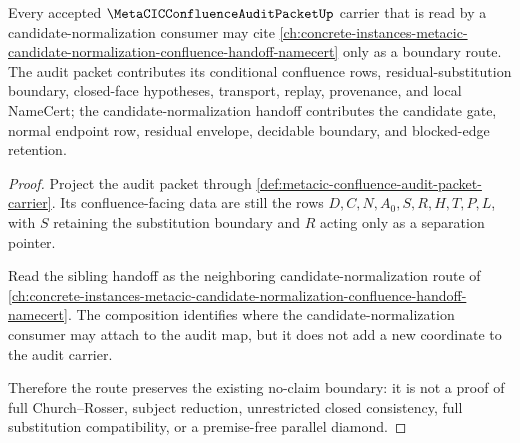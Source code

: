 \begin{lemma}
\label{lem:metacic-confluence-audit-candidate-normalization-sibling-route}
Every accepted $\MetaCICConfluenceAuditPacketUp$ carrier that is read by a candidate-normalization consumer may cite \autoref{ch:concrete-instances-metacic-candidate-normalization-confluence-handoff-namecert} only as a boundary route. The audit packet contributes its conditional confluence rows, residual-substitution boundary, closed-face hypotheses, transport, replay, provenance, and local NameCert; the candidate-normalization handoff contributes the candidate gate, normal endpoint row, residual envelope, decidable boundary, and blocked-edge retention.
\end{lemma}
\begin{proof}
Project the audit packet through \autoref{def:metacic-confluence-audit-packet-carrier}. Its confluence-facing data are still the rows $D,C,N,A_0,S,R,H,T,P,L$, with $S$ retaining the substitution boundary and $R$ acting only as a separation pointer.

Read the sibling handoff as the neighboring candidate-normalization route of \autoref{ch:concrete-instances-metacic-candidate-normalization-confluence-handoff-namecert}. The composition identifies where the candidate-normalization consumer may attach to the audit map, but it does not add a new coordinate to the audit carrier.

Therefore the route preserves the existing no-claim boundary: it is not a proof of full Church--Rosser, subject reduction, unrestricted closed consistency, full substitution compatibility, or a premise-free parallel diamond.
\end{proof}
